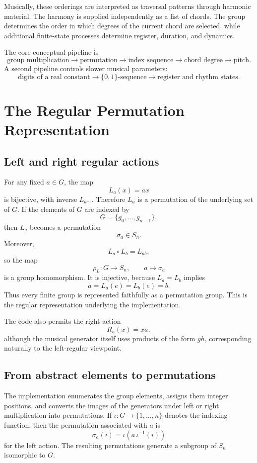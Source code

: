 \documentclass[11pt,a4paper]{article}
\begin{document}
Musically, these orderings are interpreted as traversal patterns through harmonic material. The harmony is supplied independently as a list of chords. The group determines the order in which degrees of the current chord are selected, while additional finite-state processes determine register, duration, and dynamics.

The core conceptual pipeline is
\[
\boxed{
\text{group multiplication}
\longrightarrow
\text{permutation}
\longrightarrow
\text{index sequence}
\longrightarrow
\text{chord degree}
\longrightarrow
\text{pitch}
}.
\]
A second pipeline controls slower musical parameters:
\[
\boxed{
\text{digits of a real constant}
\longrightarrow
\{0,1\}\text{-sequence}
\longrightarrow
\text{register and rhythm states}
}.
\]

\section{The Regular Permutation Representation}

\subsection{Left and right regular actions}

For any fixed $a\in G$, the map
\[
L_a(x)=ax
\]
is bijective, with inverse $L_{a^{-1}}$. Therefore $L_a$ is a permutation of the underlying set of $G$. If the elements of $G$ are indexed by
\[
G=\{g_0,\ldots,g_{n-1}\},
\]
then $L_a$ becomes a permutation
\[
\sigma_a\in S_n.
\]
Moreover,
\[
L_a\circ L_b=L_{ab},
\]
so the map
\[
\rho_L:G\longrightarrow S_n,\qquad a\longmapsto \sigma_a
\]
is a group homomorphism. It is injective, because $L_a=L_b$ implies
\[
a=L_a(e)=L_b(e)=b.
\]
Thus every finite group is represented faithfully as a permutation group. This is the regular representation underlying the implementation.

The code also permits the right action
\[
R_a(x)=xa,
\]
although the musical generator itself uses products of the form $gh$, corresponding naturally to the left-regular viewpoint.

\subsection{From abstract elements to permutations}

The implementation enumerates the group elements, assigns them integer positions, and converts the images of the generators under left or right multiplication into permutations. If $\iota:G\to\{1,\ldots,n\}$ denotes the indexing function, then the permutation associated with $a$ is
\[
\sigma_a(i)=\iota\!\left(a\,\iota^{-1}(i)\right)
\]
for the left action. The resulting permutations generate a subgroup of $S_n$ isomorphic to $G$.
\end{document}
